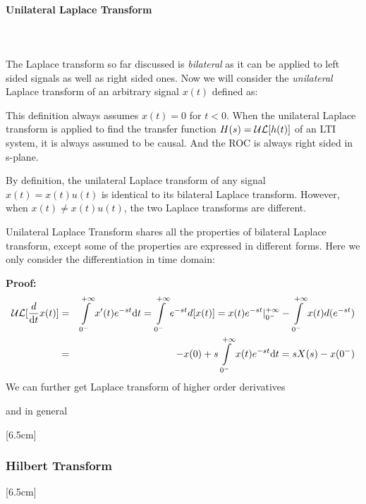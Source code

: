 	\paragraph{Unilateral Laplace Transform}\mbox{}\\\\
	The Laplace transform so far discussed is {\em bilateral} as it can be applied 
	to left sided signals as well as right sided ones. Now we will consider the
	{\em unilateral} Laplace transform of an arbitrary signal $x(t)$ defined as:
	
	This definition always assumes $x(t)=0$ for $t<0$. When the unilateral Laplace
	transform is applied to find the transfer function $H(s)={\cal UL}[h(t)]$ of an
	LTI system, it is always assumed to be causal. And the ROC is always right sided
	in s-plane.
	
	By definition, the unilateral Laplace transform of any signal $x(t)=x(t)u(t)$ 
	is identical to its bilateral Laplace transform. However, when 
	$x(t) \ne x(t)u(t)$, the two Laplace transforms are different. 
	
	Unilateral Laplace Transform shares all the properties of bilateral Laplace
	transform, except some of the properties are expressed in different forms.
	Here we only consider the differentiation in time domain:
	
	
	{\bf Proof:} 
	\begin{eqnarray}
	{\cal UL}[\frac{d}{\mathrm{d}t} x(t)]&=&\int\limits_{0^-}^{+\infty} x'(t)e^{-st}\mathrm{d}t
		=\int\limits_{0^-}^{+\infty} e^{-st}d[x(t)]
		=x(t)e^{-st}|_{0^-}^{+\infty}-\int\limits_{0^-}^{+\infty} x(t)d(e^{-st})
		\nonumber \\
		&=&-x(0)+s \int\limits_{0^-}^{+\infty} x(t)e^{-st}\mathrm{d}t=sX(s)-x(0^-)
		\nonumber
	\end{eqnarray}
	We can further get Laplace transform of higher order derivatives
	
	and in general
	

	[6.5cm]
	
	\pagebreak
	\subsubsection{Hilbert Transform}
	[6.5cm]
	
	\pagebreak
